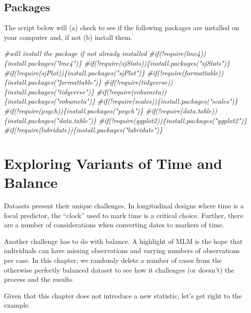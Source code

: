 \documentclass[
  english,
]{book}
\newenvironment{Shaded}{\begin{snugshade}}{\end{snugshade}}
\newcommand{\CommentTok}[1]{\textcolor[rgb]{0.56,0.35,0.01}{\textit{#1}}}
\begin{document}
\hypertarget{packages-4}{%
\subsection{Packages}\label{packages-4}}

The script below will (a) check to see if the following packages are installed on your computer and, if not (b) install them.

\begin{Shaded}
\begin{Highlighting}[]
\CommentTok{\#will install the package if not already installed}
\CommentTok{\#if(!require(lme4))\{install.packages("lme4")\}}
\CommentTok{\#if(!require(sjStats))\{install.packages("sjStats")\}}
\CommentTok{\#if(!require(sjPlot))\{install.packages("sjPlot")\}}
\CommentTok{\#if(!require(formattable))\{install.packages("formattable")\}}
\CommentTok{\#if(!require(tidyverse))\{install.packages("tidyverse")\}}
\CommentTok{\#if(!require(robumeta))\{install.packages("robumeta")\}}
\CommentTok{\#if(!require(scales))\{install.packages("scales")\}}
\CommentTok{\#if(!require(psych))\{install.packages("psych")\}}
\CommentTok{\#if(!require(data.table))\{install.packages("data.table")\}}
\CommentTok{\#if(!require(ggplot2))\{install.packages("ggplot2")\}}
\CommentTok{\#if(!require(lubridate))\{install.packages("lubridate")\}}
\end{Highlighting}
\end{Shaded}

\hypertarget{exploring-variants-of-time-and-balance}{%
\section{Exploring Variants of Time and Balance}\label{exploring-variants-of-time-and-balance}}

Datasets present their unique challenges. In longitudinal designs where time is a focal predictor, the ``clock'' used to mark time is a critical choice. Further, there are a number of considerations when converting dates to markers of time.

Another challenge has to do with balance. A highlight of MLM is the hope that individuals can have missing observations and varying numbers of observations per case. In this chapter, we randomly delete a number of cases from the otherwise perfectly balanced dataset to see how it challenges (or doesn't) the process and the results.

Given that this chapter does not introduce a new statistic, let's get right to the example.
\end{document}
